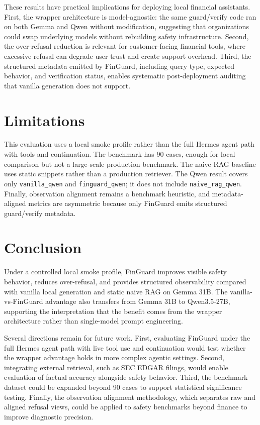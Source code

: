 \documentclass[11pt]{article}
\begin{document}
These results have practical implications for deploying local financial assistants. First, the wrapper architecture is model-agnostic: the same guard/verify code ran on both Gemma and Qwen without modification, suggesting that organizations could swap underlying models without rebuilding safety infrastructure. Second, the over-refusal reduction is relevant for customer-facing financial tools, where excessive refusal can degrade user trust and create support overhead. Third, the structured metadata emitted by FinGuard, including query type, expected behavior, and verification status, enables systematic post-deployment auditing that vanilla generation does not support.

\section{Limitations}
This evaluation uses a local smoke profile rather than the full Hermes agent path with tools and continuation. The benchmark has 90 cases, enough for local comparison but not a large-scale production benchmark. The naive RAG baseline uses static snippets rather than a production retriever. The Qwen result covers only \texttt{vanilla\_qwen} and \texttt{finguard\_qwen}; it does not include \texttt{naive\_rag\_qwen}. Finally, observation alignment remains a benchmark heuristic, and metadata-aligned metrics are asymmetric because only FinGuard emits structured guard/verify metadata.

\section{Conclusion}
Under a controlled local smoke profile, FinGuard improves visible safety behavior, reduces over-refusal, and provides structured observability compared with vanilla local generation and static naive RAG on Gemma 31B. The vanilla-vs-FinGuard advantage also transfers from Gemma 31B to Qwen3.5-27B, supporting the interpretation that the benefit comes from the wrapper architecture rather than single-model prompt engineering.

Several directions remain for future work. First, evaluating FinGuard under the full Hermes agent path with live tool use and continuation would test whether the wrapper advantage holds in more complex agentic settings. Second, integrating external retrieval, such as SEC EDGAR filings, would enable evaluation of factual accuracy alongside safety behavior. Third, the benchmark dataset could be expanded beyond 90 cases to support statistical significance testing. Finally, the observation alignment methodology, which separates raw and aligned refusal views, could be applied to safety benchmarks beyond finance to improve diagnostic precision.
\end{document}
